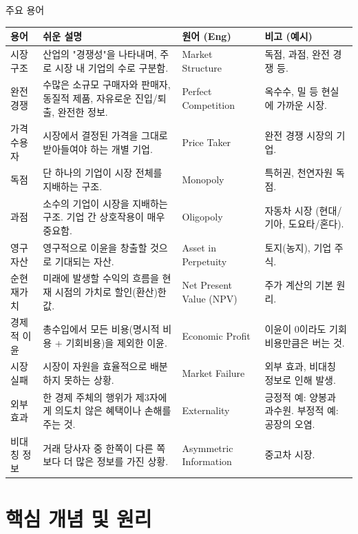 \documentclass[11pt,a4paper]{article}
\theoremstyle{definition}
\begin{document}
\begin{mybox}{주요 용어}
\small
\begin{tabularx}{\textwidth}{@{}>{\raggedright\arraybackslash}p{2.5cm} >{\raggedright\arraybackslash}X >{\raggedright\arraybackslash}p{2.8cm} >{\raggedright\arraybackslash}p{3cm}@{}}
\toprule
\textbf{용어} & \textbf{쉬운 설명} & \textbf{원어 (Eng)} & \textbf{비고 (예시)} \\
\midrule
시장 구조 & 산업의 "경쟁성"을 나타내며, 주로 시장 내 기업의 수로 구분함. & Market Structure & 독점, 과점, 완전 경쟁 등. \\
완전 경쟁 & 수많은 소규모 구매자와 판매자, 동질적 제품, 자유로운 진입/퇴출, 완전한 정보. & Perfect Competition & 옥수수, 밀 등 현실에 가까운 시장. \\
가격 수용자 & 시장에서 결정된 가격을 그대로 받아들여야 하는 개별 기업. & Price Taker & 완전 경쟁 시장의 기업. \\
독점 & 단 하나의 기업이 시장 전체를 지배하는 구조. & Monopoly & 특허권, 천연자원 독점. \\
과점 & 소수의 기업이 시장을 지배하는 구조. 기업 간 상호작용이 매우 중요함. & Oligopoly & 자동차 시장 (현대/기아, 도요타/혼다). \\
영구 자산 & 영구적으로 이윤을 창출할 것으로 기대되는 자산. & Asset in Perpetuity & 토지(농지), 기업 주식. \\
순현재가치 & 미래에 발생할 수익의 흐름을 현재 시점의 가치로 할인(환산)한 값. & Net Present Value (NPV) & 주가 계산의 기본 원리. \\
경제적 이윤 & 총수입에서 모든 비용(명시적 비용 + 기회비용)을 제외한 이윤. & Economic Profit & 이윤이 0이라도 기회비용만큼은 버는 것. \\
시장 실패 & 시장이 자원을 효율적으로 배분하지 못하는 상황. & Market Failure & 외부 효과, 비대칭 정보로 인해 발생. \\
외부 효과 & 한 경제 주체의 행위가 제3자에게 의도치 않은 혜택이나 손해를 주는 것. & Externality & 긍정적 예: 양봉과 과수원. 부정적 예: 공장의 오염. \\
비대칭 정보 & 거래 당사자 중 한쪽이 다른 쪽보다 더 많은 정보를 가진 상황. & Asymmetric Information & 중고차 시장. \\
\bottomrule
\end{tabularx}
\end{mybox}

\newpage
\section{핵심 개념 및 원리}
\end{document}
